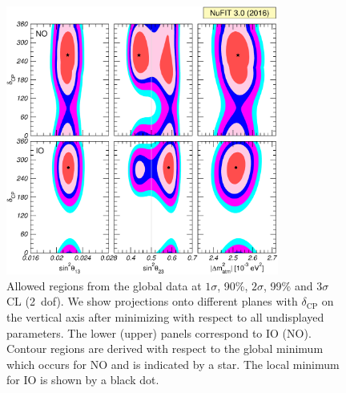 \documentclass[a4paper, 11pt]{article}
\begin{document}
\begin{figure}\centering
  \includegraphics[width=0.8\textwidth]{fig-region-hier}
  \caption{Allowed regions from the global data at $1\sigma$, 90\%,
    $2\sigma$, 99\% and $3\sigma$ CL (2~dof). We show projections onto
    different planes with $\delta_\text{CP}$ on the vertical axis
    after minimizing with respect to all undisplayed parameters. The
    lower (upper) panels correspond to IO (NO).  Contour regions are
    derived with respect to the global minimum which occurs for NO and
    is indicated by a star. The local minimum for IO is shown by a
    black dot.}
  \label{fig:region-hier}
\end{figure}
\end{document}
